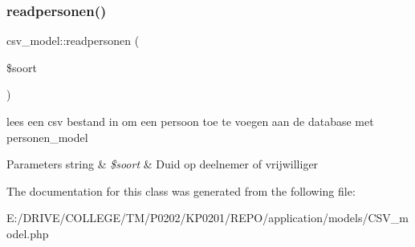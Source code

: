 \subsubsection{\texorpdfstring{readpersonen()}{readpersonen()}}
{\footnotesize\ttfamily csv\+\_\+model\+::readpersonen (\begin{DoxyParamCaption}\item[{}]{\$soort }\end{DoxyParamCaption})}

lees een csv bestand in om een persoon toe te voegen aan de database met personen\+\_\+model 
\begin{DoxyParams}[1]{Parameters}
string & {\em \$soort} & Duid op deelnemer of vrijwilliger \\
\hline
\end{DoxyParams}


The documentation for this class was generated from the following file\+:\begin{DoxyCompactItemize}
\item 
E\+:/\+D\+R\+I\+V\+E/\+C\+O\+L\+L\+E\+G\+E/\+T\+M/\+P0202/\+K\+P0201/\+R\+E\+P\+O/application/models/C\+S\+V\+\_\+model.\+php\end{DoxyCompactItemize}

